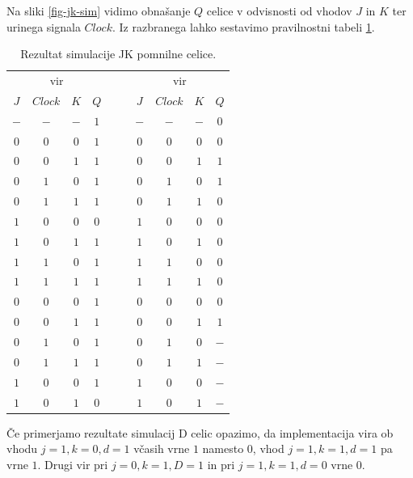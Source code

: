 \documentclass[a4paper, 11pt]{article}
\begin{document}
Na sliki \ref{fig-jk-sim} vidimo obnašanje $Q$ celice v odvisnosti od vhodov $J$ in $K$ ter urinega signala $Clock$. Iz razbranega lahko sestavimo pravilnostni tabeli \ref{tab-jk-sim}.
\begin{table}[h!]
	\centering
	\small
	\begin{tabular}{ccc|ccccc|c}
	\multicolumn{4}{c}{vir \cite{quantum_dot}} & $\quad$ & \multicolumn{4}{c}{vir \cite{a_novel_approach}}\\
	$J$ & $Clock$ & $K$ & $Q$ && $J$ & $Clock$ & $K$ & $Q$ \\
	\cline{1-4} \cline{6-9}
	$-$ & $-$ & $-$ & $1$ && $-$ & $-$ & $-$ & $0$\\
	$0$ & $0$ & $0$ & $1$ && $0$ & $0$ & $0$ & $0$\\
	$0$ & $0$ & $1$ & $1$ && $0$ & $0$ & $1$ & $1$\\
	$0$ & $1$ & $0$ & $1$ && $0$ & $1$ & $0$ & $1$\\
	$0$ & $1$ & $1$ & $1$ && $0$ & $1$ & $1$ & $0$\\
	$1$ & $0$ & $0$ & $0$ && $1$ & $0$ & $0$ & $0$\\
	$1$ & $0$ & $1$ & $1$ && $1$ & $0$ & $1$ & $0$\\
	$1$ & $1$ & $0$ & $1$ && $1$ & $1$ & $0$ & $0$\\
	\cline{1-4} \cline{6-9}
	$1$ & $1$ & $1$ & $1$ && $1$ & $1$ & $1$ & $0$\\
	$0$ & $0$ & $0$ & $1$ && $0$ & $0$ & $0$ & $0$\\
	$0$ & $0$ & $1$ & $1$ && $0$ & $0$ & $1$ & $1$\\
	$0$ & $1$ & $0$ & $1$ && $0$ & $1$ & $0$ & $-$\\
	$0$ & $1$ & $1$ & $1$ && $0$ & $1$ & $1$ & $-$\\
	$1$ & $0$ & $0$ & $1$ && $1$ & $0$ & $0$ & $-$\\
	$1$ & $0$ & $1$ & $0$ && $1$ & $0$ & $1$ & $-$\\
	\end{tabular}
	\caption{Rezultat simulacije JK pomnilne celice.}
	\label{tab-jk-sim}
\end{table}

Če primerjamo rezultate simulacij D celic opazimo, da implementacija vira \cite{quantum_dot} ob vhodu $j=1,k=0,d=1$ včasih vrne $1$ namesto $0$, vhod $j=1,k=1,d=1$ pa vrne $1$. Drugi vir pri $j=0,k=1,D=1$ in pri $j=1, k=1, d=0$ vrne $0$.
\end{document}
